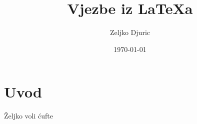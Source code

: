 \documentclass[12pt]{scrartcl}
\begin{document}
    \title{Vjezbe iz \LaTeX a}
    \author{Zeljko Djuric}
    \date{\today}
    \maketitle
    \section{Uvod}
    \v{Z}eljko  voli \'{c}ufte
\end{document}
